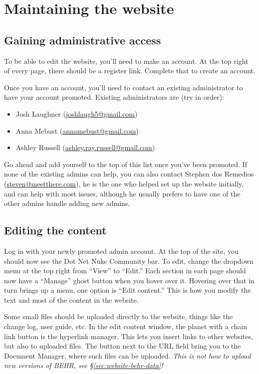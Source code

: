 \documentclass[12pt]{article}
\begin{document}
	
\section{Maintaining the website}\label{sec:website}
	\subsection{Gaining administrative access}
		To be able to edit the website, you'll need to make an account.  At the top right of every page, there should be a register link.  Complete that to create an account.
		
		Once you have an account, you'll need to contact an existing administrator to have your account promoted. Existing administrators are (try in order):
		\begin{itemize}
		\item Josh Laughner (\href{mailto:joshlaugh5@gmail.com}{joshlaugh5@gmail.com})
		\item Anna Mebust (\href{mailto:annamebust@gmail.com}{annamebust@gmail.com})
		\item Ashley Russell (\href{mailto:ashley.ray.russell@gmail.com}{ashley.ray.russell@gmail.com})
		\end{itemize}
		
		Go ahead and add yourself to the top of this list once you've been promoted.  If none of the existing admins can help, you can also contact Stephen dos Remedios (\href{mailto:steven@meetthere.com}{steven@meetthere.com}), he is the one who helped set up the website initially, and can help with most issues, although he usually prefers to have one of the other admins handle adding new admins.
		
	\subsection{Editing the content}
	
		Log in with your newly promoted admin account.  At the top of the site, you should now see the Dot Net Nuke Community bar. To edit, change the dropdown menu at the top right from ``View'' to ``Edit.'' Each section in each page should now have a ``Manage'' ghost button when you hover over it.  Hovering over that in turn brings up a menu, one option is ``Edit content.'' This is how you modify the text and most of the content in the website.
		
		Some small files should be uploaded directly to the website, things like the change log, user guide, etc. In the edit content window, the planet with a chain link button is the hyperlink manager.  This lets you insert links to other websites, but also to uploaded files. The button next to the URL field bring you to the Document Manager, where such files can be uploaded. \emph{This is not how to upload new versions of BEHR, see \S\ref{sec:website-behr-data}!}
		
\end{document}
